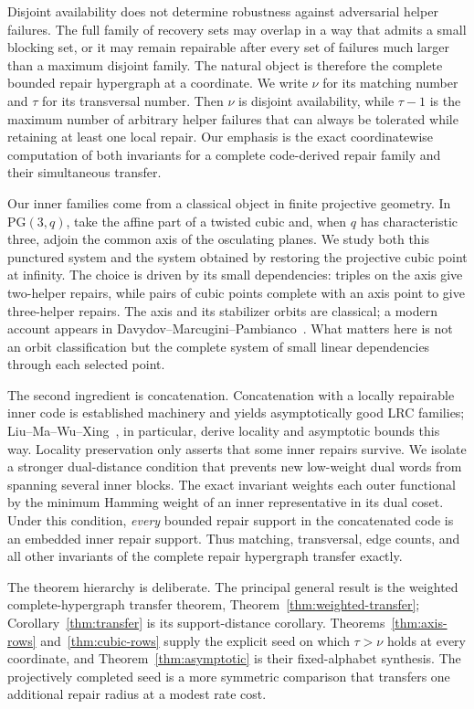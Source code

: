 \documentclass[11pt]{article}
\theoremstyle{definition}
\theoremstyle{remark}
\begin{document}
Disjoint availability does not determine robustness against adversarial
helper failures.  The full family of recovery sets may overlap in a way that
admits a small blocking set, or it may remain repairable after every set of
failures much larger than a maximum disjoint family.  The natural object is
therefore the complete bounded repair hypergraph at a coordinate.  We write
$\nu$ for its matching number and $\tau$ for its transversal number.  Then
$\nu$ is disjoint availability, while $\tau-1$ is the maximum number of
arbitrary helper failures that can always be tolerated while retaining at
least one local repair.  Our emphasis is the exact coordinatewise computation
of both invariants for a complete code-derived repair family and their
simultaneous transfer.

Our inner families come from a classical object in finite projective
geometry.  In $\mathrm{PG}(3,q)$, take the affine part of a twisted cubic and,
when $q$ has characteristic three, adjoin the common axis of the osculating
planes.  We study both this punctured system and the system obtained by
restoring the projective cubic point at infinity.  The choice is driven by
its small dependencies: triples on the axis give two-helper repairs, while
pairs of cubic points complete with an axis point to give three-helper
repairs.  The axis and its
stabilizer orbits are classical; a modern account
appears in Davydov--Marcugini--Pambianco~\cite{DavydovEtAl2021}.  What matters
here is not an orbit classification but the complete system of small linear
dependencies through each selected point.

The second ingredient is concatenation.  Concatenation with a locally
repairable inner code is established machinery and yields asymptotically
good LRC families; Liu--Ma--Wu--Xing~\cite{LiuEtAl2022}, in particular,
derive locality and asymptotic bounds this way.  Locality preservation only
asserts that some inner repairs survive.  We isolate a stronger dual-distance
condition that prevents new low-weight dual words from spanning several
inner blocks.  The exact invariant weights each outer functional by the
minimum Hamming weight of an inner representative in its dual coset.  Under
this condition, \emph{every} bounded repair support in
the concatenated code is an embedded inner repair support.  Thus matching,
transversal, edge counts, and all other invariants of the complete repair
hypergraph transfer exactly.

The theorem hierarchy is deliberate.  The principal general result is the
weighted complete-hypergraph transfer theorem,
Theorem~\ref{thm:weighted-transfer}; Corollary~\ref{thm:transfer} is its
support-distance corollary.
Theorems~\ref{thm:axis-rows} and~\ref{thm:cubic-rows} supply the explicit
seed on which $\tau>\nu$ holds at every coordinate, and
Theorem~\ref{thm:asymptotic} is their fixed-alphabet synthesis.  The
projectively completed seed is a more symmetric comparison that transfers
one additional repair radius at a modest rate cost.
\end{document}
